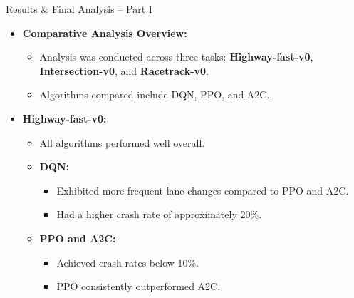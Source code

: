 \documentclass{beamer}
\begin{document}
\begin{frame}{Results \& Final Analysis -- Part I}
  \begin{itemize}[<+->]
  \item \textbf{Comparative Analysis Overview:}
    \begin{itemize}[<+->]
      \item Analysis was conducted across three tasks: \textbf{Highway-fast-v0}, \textbf{Intersection-v0}, and \textbf{Racetrack-v0}.
      \item Algorithms compared include DQN, PPO, and A2C.
    \end{itemize}
  \item \textbf{Highway-fast-v0:}
    \begin{itemize}[<+->]
      \item All algorithms performed well overall.
      \item \textbf{DQN:}
        \begin{itemize}[<+->]
          \item Exhibited more frequent lane changes compared to PPO and A2C.
          \item Had a higher crash rate of approximately 20\%.
        \end{itemize}
      \item \textbf{PPO and A2C:}
        \begin{itemize}[<+->]
          \item Achieved crash rates below 10\%.
          \item PPO consistently outperformed A2C.
        \end{itemize}
    \end{itemize}
    \end{itemize}
\end{frame}
\end{document}
